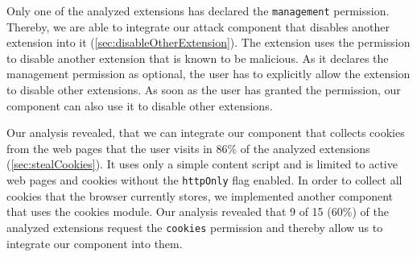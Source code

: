 	Only one of the analyzed extensions has declared the \texttt{management} permission. Thereby, we are able to integrate our attack component that disables another extension into it (\autoref{sec:disableOtherExtension}). The extension uses the permission to disable another extension that is known to be malicious. As it declares the management permission as optional, the user has to explicitly allow the extension to disable other extensions. As soon as the user has granted the permission, our component can also use it to disable other extensions. %

	Our analysis revealed, that we can integrate our component that collects cookies from the web pages that the user visits in 86\% of the analyzed extensions (\autoref{sec:stealCookies}). It uses only a simple content script and is limited to active web pages and cookies without the \texttt{httpOnly} flag enabled. In order to collect all cookies that the browser currently stores, we implemented another component that uses the cookies module. Our analysis revealed that 9 of 15 (60\%) of the analyzed extensions request the \texttt{cookies} permission and thereby allow us to integrate our component into them. 
	
